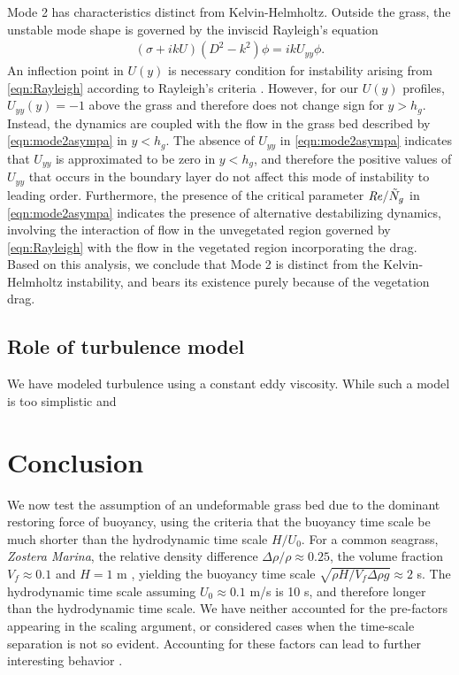 \documentclass{jfm}
\newcommand{\hg}{h_g}
\newcommand{\Ndg}{\tilde{N}_g}
\begin{document}
Mode 2 has characteristics distinct from Kelvin-Helmholtz. Outside the grass, the unstable mode shape is governed by the inviscid Rayleigh's equation
\begin{align}
\left(\sigma+ikU\right) \left(D^2-k^2\right)\phi =  ikU_{yy}\phi. 
\label{eqn:Rayleigh}
\end{align}
An inflection point in $U(y)$ is necessary condition for instability arising from \eqref{eqn:Rayleigh} according to Rayleigh's criteria \cite{Rayleigh1879}. 
However, for our $U(y)$ profiles, $U_{yy}(y) = -1$ above the grass and therefore does not change sign for $y>\hg$. 
Instead, the dynamics are coupled with the flow in the grass bed described by \eqref{eqn:mode2asympa} in $y< \hg$.
The absence of $U_{yy}$ in \eqref{eqn:mode2asympa} indicates that $U_{yy}$ is approximated to be zero in $y<\hg$, and therefore the positive values of $U_{yy}$ that occurs in the boundary layer do not affect this mode of instability to leading order.
Furthermore, the presence of the critical parameter $\Rey/\Ndg$ in \eqref{eqn:mode2asympa} indicates the presence of alternative destabilizing dynamics, involving the interaction of flow in the unvegetated region governed by \eqref{eqn:Rayleigh} with the flow in the vegetated region incorporating the drag.
Based on this analysis, we conclude that Mode 2 is distinct from the Kelvin-Helmholtz instability, and bears its existence purely because of the vegetation drag.

\subsection{Role of turbulence model}\label{subsec:turbulencemodel}
We have modeled turbulence using a constant eddy viscosity. 
While such a model is too simplistic and 

\section{Conclusion}
We now test the assumption of an undeformable grass bed due to the dominant restoring force of buoyancy, using the criteria that the buoyancy time scale be much shorter than the hydrodynamic time scale $H/U_0$.
For a common seagrass, \textit{Zostera Marina}, the relative density difference $\Delta \rho /\rho \approx 0.25$, the volume fraction $V_f \approx 0.1$ and $H=1$ m \cite{Fonseca98}, yielding the buoyancy time scale $\sqrt{\rho H/V_f \Delta \rho g} \approx 2$ s.
The hydrodynamic time scale assuming $U_0 \approx 0.1$ m/s is 10 s, and therefore longer than the hydrodynamic time scale.
We have neither accounted for the pre-factors appearing in the scaling argument, or considered cases when the time-scale separation is not so evident. Accounting for these factors  can lead to further interesting behavior \cite{Delangre06}.
\end{document}
